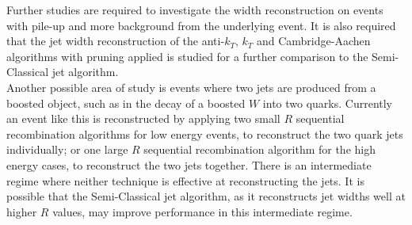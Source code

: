 \documentclass[a4paper,11pt, onecolumn]{article}
\begin{document}
  Further studies are required to investigate the width reconstruction on events with pile-up and more background from the underlying event. 
  It is also required that the jet width reconstruction of the anti-$k_T$, $k_T$ and Cambridge-Aachen algorithms with pruning applied is 
  studied for a further comparison to the Semi-Classical jet algorithm. \\

  Another possible area of study is events where two jets are produced from a boosted object, such as in the decay of a boosted $W$ into two quarks. 
  Currently an event like this is reconstructed by applying two small $R$ sequential recombination algorithms for low energy events, to reconstruct 
  the two quark jets individually; or one large $R$ sequential recombination algorithm for the high energy cases, to reconstruct the two jets together. 
  There is an intermediate regime where neither technique is effective at reconstructing the jets. It is possible that the Semi-Classical jet algorithm, 
  as it reconstructs jet widths well at higher $R$ values, may improve performance in this intermediate regime.
  
 
\end{document}
